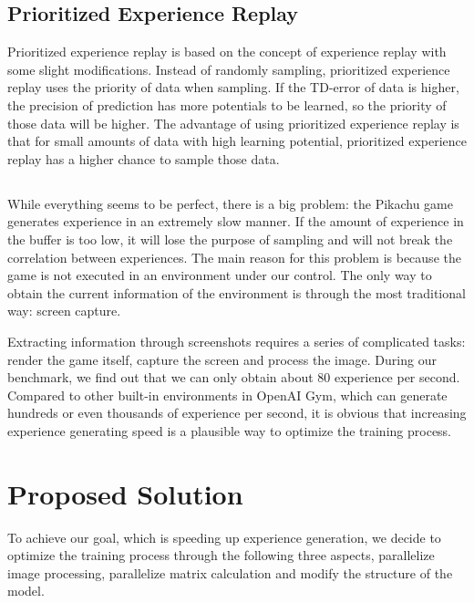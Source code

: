 \documentclass[sigconf]{acmart}
\begin{document}
\subsection{Prioritized Experience Replay}
Prioritized experience replay is based on the concept of experience replay with some slight modifications. Instead of randomly sampling, prioritized experience replay uses the priority of data when sampling. If the TD-error of data is higher, the precision of prediction has more potentials to be learned, so the priority of those data will be higher. The advantage of using prioritized experience replay is that for small amounts of data with high learning potential, prioritized experience replay has a higher chance to sample those data.


\subsection*{}
While everything seems to be perfect, there is a big problem: the Pikachu game generates experience in an extremely slow manner. If the amount of experience in the buffer is too low, it will lose the purpose of sampling and will not break the correlation between experiences. The main reason for this problem is because the game is not executed in an environment under our control. The only way to obtain the current information of the environment is through the most traditional way: screen capture.

Extracting information through screenshots requires a series of complicated tasks: render the game itself, capture the screen and process the image. During our benchmark, we find out that we can only obtain about 80 experience per second. Compared to other built-in environments in OpenAI Gym, which can generate hundreds or even thousands of experience per second, it is obvious that increasing experience generating speed is a plausible way to optimize the training process.

\section{Proposed Solution}
To achieve our goal, which is speeding up experience generation, we decide to optimize the training process through the following three aspects, parallelize image processing, parallelize matrix calculation and modify the structure of the model.
\end{document}
